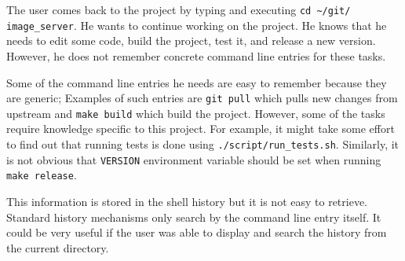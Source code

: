 \documentclass[thesis=M,english]{FITthesis}[2012/10/20]
\begin{document}
The user comes back to the project by typing and executing \verb|cd ~/git/| \verb|image_server|. He wants to continue working on the project. He knows that he needs to edit some code, build the project, test it, and release a new version. However, he does not remember concrete command line entries for these tasks. 

Some of the command line entries he needs are easy to remember because they are generic; Examples of such entries are \verb|git pull| which pulls new changes from upstream and \verb|make build| which build the project. However, some of the tasks require knowledge specific to this project. For example, it might take some effort to find out that running tests is done using \verb|./script/run_tests.sh|. Similarly, it is not obvious that \verb|VERSION| environment variable should be set when running \verb|make release|.

This information is stored in the shell history but it is not easy to retrieve. Standard history mechanisms only search by the command line entry itself. It could be very useful if the user was able to display and search the history from the current directory.


















\end{document}
